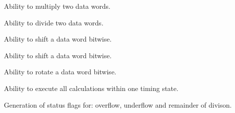 \begin{requirement}
  Ability to multiply two data words.
\end{requirement}

\begin{requirement}
  Ability to divide two data words.
\end{requirement}

\begin{requirement}
  Ability to shift a data word bitwise.
\end{requirement}

\begin{requirement}
  Ability to shift a data word bitwise.
\end{requirement}

\begin{requirement}
  Ability to rotate a data word bitwise.
\end{requirement}

\begin{requirement}
  Ability to execute all calculations within one timing state.
\end{requirement}

\begin{requirement}
  Generation of status flags for: overflow, underflow and remainder of divison. 
\end{requirement}



